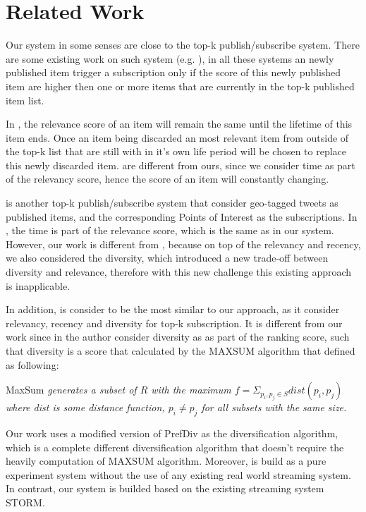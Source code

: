 \section{Related Work}

Our system in some senses are close to the top-k publish/subscribe system.  There are some existing work on such system (e.g. \cite{Cong:2009,Haghani:2009,Haghani:2010,Aberer:2008}), in all these systems an newly published item trigger a  subscription only if the score of this newly published item are higher then one or more items that are currently in the top-k published item list.  

In \cite{Haghani:2009,Haghani:2010,Aberer:2008}, the relevance score of an item will remain the same until the lifetime of this item ends. Once an item being discarded an most relevant item from outside of the top-k list that are still with in it's own life period will be chosen to replace this newly discarded item. \cite{Haghani:2009,Haghani:2010,Aberer:2008} are different from ours, since we consider time as part of the relevancy score, hence the score of an item will constantly changing. 

\cite{Cong:2009} is another top-k publish/subscribe system that consider geo-tagged tweets as published items, and the corresponding Points of Interest as the subscriptions. In \cite{Cong:2009} , the time is part of the relevance score, which is the same as in our system. However, our work is different from \cite{Cong:2009} , because on top of the relevancy and recency, we also considered the diversity, which introduced a new trade-off between diversity and relevance, therefore with this new challenge this existing approach is inapplicable. 

In addition, \cite{Chen:2015} is consider to be the most similar to our approach, as it consider relevancy, recency and diversity for top-k subscription. It is different from our work since in \cite{Chen:2015} the author consider diversity as as part of the ranking score, such that diversity is a score that calculated by the MAXSUM algorithm that defined as following:

\begin{mydef} \label{def1}
 MaxSum \emph{generates a subset of $R$ with the maximum $f = \Sigma_{p_i,p_j \in S} dist(p_i, p_j )$ where \emph{dist} is some distance function, $p_i \neq p_j$ for all subsets with the same size.}
\end{mydef}

Our work uses a modified version of PrefDiv as the diversification algorithm, which is a complete different diversification algorithm that doesn't require the heavily computation of MAXSUM algorithm. Moreover, \cite{Chen:2015} is build as a pure experiment system without the use of any existing real world streaming system. In contrast, our system is builded based on the existing streaming system STORM.